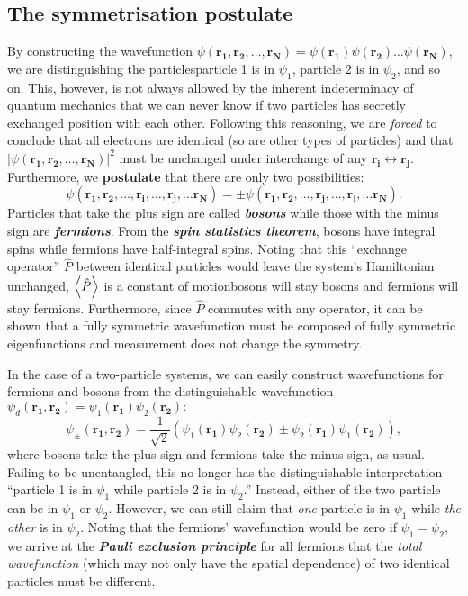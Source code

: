 \documentclass{article}
\theoremstyle{nonumberplain}
\begin{document}
\subsection{The symmetrisation postulate}
By constructing the wavefunction $\psi(\mathbf{r_1}, \mathbf{r_2},\ldots ,\mathbf{r_N}  ) = \psi (\mathbf{r_1} ) \psi (\mathbf{r_2} )\ldots \psi (\mathbf{r_N})  $, we are distinguishing the particles\textemdash particle 1 is in $\psi_1$, particle 2 is in $\psi_2$, and so on. This, however, is not always allowed by the inherent indeterminacy of quantum mechanics that we can never know if two particles has secretly exchanged position with each other. Following this reasoning, we are \textit{forced} to conclude that all electrons are identical (so are other types of particles) and that $\left\vert \psi(\mathbf{r_1}, \mathbf{r_2},\ldots ,\mathbf{r_N} )  \right\vert ^2$ must be unchanged under interchange of any $\mathbf{r_i} \longleftrightarrow \mathbf{r_j}. $ Furthermore, we \textbf{postulate} that there are only two possibilities: 
\[
    \psi(\mathbf{r_1}, \mathbf{r_2}, \ldots  , \mathbf{r_i}, \ldots  , \mathbf{r_j}, \ldots  \mathbf{r_N}     )
    = \pm \psi(\mathbf{r_1}, \mathbf{r_2}, \ldots  , \mathbf{r_j}, \ldots  , \mathbf{r_i}, \ldots  \mathbf{r_N}  ). 
\]
Particles that take the plus sign are called \textit{\textbf{bosons}} while those with the minus sign are \textit{\textbf{fermions}}. From the \textit{\textbf{spin statistics theorem}}, bosons have integral spins while fermions have half-integral spins. Noting that this ``exchange operator'' $\hat{P} $ between identical particles would leave the system's Hamiltonian unchanged, $\expval{\hat{P} }$ is a constant of motion\textemdash bosons will stay bosons and fermions will stay fermions. Furthermore, since $\hat{P}$ commutes with any operator, it can be shown that a fully symmetric wavefunction must be composed of fully symmetric eigenfunctions and measurement does not change the symmetry. 

In the case of a two-particle systems, we can easily construct wavefunctions for fermions and bosons from the distinguishable wavefunction 
\(
    \psi_d(\mathbf{r_1}, \mathbf{r_2}  ) = \psi_1 (\mathbf{r_1} ) \psi_2 (\mathbf{r_2} ):   
\) 
\[
    \psi_{\pm}(\mathbf{r_1}, \mathbf{r_2}  )
    = \frac{1}{\sqrt{2} } \left( 
        \psi_1 (\mathbf{r_1} ) \psi_2 (\mathbf{r_2} ) \pm
        \psi_2 (\mathbf{r_1} ) \psi_1 (\mathbf{r_2} )
    \right),
\]
where bosons take the plus sign and fermions take the minus sign, as usual. Failing to be unentangled, this no longer has the distinguishable interpretation ``particle 1 is in $\psi_1 $ while particle 2 is in $\psi_2$.'' Instead, either of the two particle can be in $\psi_1$ or $\psi_2$. However, we can still claim that \textit{one} particle is in $\psi_1$ while \textit{the other} is in $\psi_2$. Noting that the fermions' wavefunction would be zero if $\psi_1 = \psi_2,$ we arrive at the \textit{\textbf{Pauli exclusion principle}} for all fermions that the \textit{total wavefunction} (which may not only have the spatial dependence) of two identical particles must be different.
\end{document}
